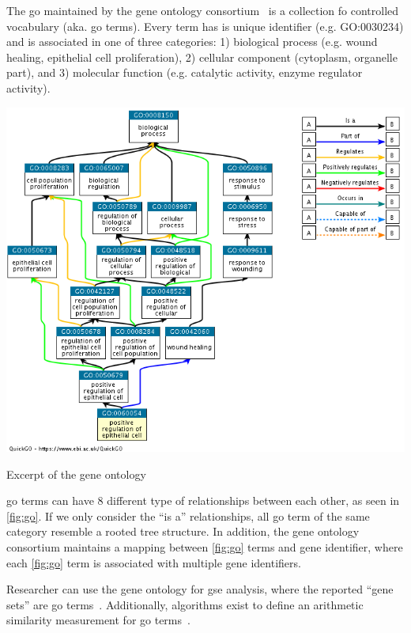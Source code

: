 \documentclass{thesisclass}
\begin{document}
The \acrfull{go} maintained by the gene ontology consortium~\cite{Ashburner2000,doi:10.1093/nar/gkw1108} is a collection fo controlled vocabulary (aka. \acrshort{go} terms). Every term has is unique identifier (e.g. GO:0030234) and is associated in one of three categories: 1) biological process (e.g. wound healing, epithelial cell proliferation), 2) cellular component (cytoplasm, organelle part), and 3) molecular function (e.g. catalytic activity, enzyme regulator activity).

\begin{centeredFigure}[!h]
	\includegraphics[scale=0.4]{figures/introduction/go.png}
	\caption{Excerpt of the gene ontology}
	\label{fig:go}
\end{centeredFigure}

\acrshort{go} terms can have 8 different type of relationships between each other, as seen in \cref{fig:go}. If we only consider the ``is a'' relationships, all \acrshort{go} term of the same category resemble a rooted tree structure. In addition, the gene ontology consortium maintains a mapping between \cref{fig:go} terms and gene identifier, where each \cref{fig:go} term is associated with multiple gene identifiers. 

Researcher can use the gene ontology for \acrshort{gse} analysis, where the reported ``gene sets'' are \acrshort{go} terms~\cite{doi:10.1093/bioinformatics/btl140}.  Additionally, algorithms exist to define an arithmetic similarity measurement for \acrshort{go} terms~\cite{doi:10.1093/bioinformatics/btq064}.
\end{document}
